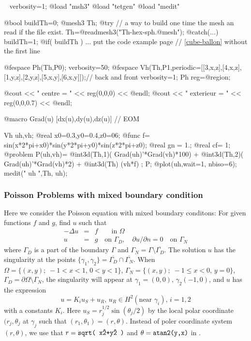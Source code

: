 \documentclass[a4paper,twoside,12pt]{book}
\def\p{\partial}
\begin{document}
\begin{example}~
\label{exm:Period-Poisson-cube-ballon}
\bFF
verbosity=1;
@load "msh3"
@load "tetgen"
@load "medit"

@bool buildTh=0;
@mesh3 Th;
@try { //  a way to build one time the mesh an read if the file exist.
  Th=@readmesh3("Th-hex-sph.@mesh");
 }
@catch(...) { buildTh=1;}
@if( buildTh ){
  ...
 put the code  example  page // \ref{cube-ballon}\pageref{cube-ballon}
  without the first line
 }


@fespace Ph(Th,P0);
verbosity=50;
@fespace Vh(Th,P1,periodic=[[3,x,z],[4,x,z],[1,y,z],[2,y,z],[5,x,y],[6,x,y]]);// back and front
verbosity=1;
Ph reg=@region;

@cout << "  centre = " << reg(0,0,0) << @endl;
@cout << " exterieur = " << reg(0,0,0.7) << @endl;

@macro Grad(u) [dx(u),dy(u),dz(u)] // EOM

Vh uh,vh;
@real x0=0.3,y0=0.4,z0=06;
@func f= sin(x*2*pi+x0)*sin(y*2*pi+y0)*sin(z*2*pi+z0);
@real gn = 1.;
@real cf= 1;
@problem P(uh,vh)=
     @int3d(Th,1)( Grad(uh)'*Grad(vh)*100)
  +  @int3d(Th,2)( Grad(uh)'*Grad(vh)*2)
  + @int3d(Th) (vh*f)
  ;
  P;
@plot(uh,wait=1, nbiso=6);
medit("   uh ",Th, uh);
\eFF


\end{example}
\subsubsection{Poisson Problems with mixed boundary condition}
Here we consider the Poisson equation with mixed boundary
conditons: For given functions $f$ and $g$, find $u$ such that
\begin{eqnarray}
\label{eqn:mixBoundary}
-\Delta u &=& f\qquad \textrm{in }\Omega\nonumber\\
u&=&g\quad \textrm{on }\Gamma_D,\quad
\p u/\p n=0\quad \textrm{on }\Gamma_N
\end{eqnarray}
where $\Gamma_D$ is a part of the boundary $\Gamma$ and
$\Gamma_N=\Gamma\setminus \overline{\Gamma_D}$.
The solution $u$ has the singularity at the points
$\{\gamma_1,\gamma_2\}=\overline{\Gamma_D}\cap\overline{\Gamma_N}$.
When $\Omega=\{(x,y);\; -1<x<1,\, 0<y<1\}$,
$\Gamma_N=\{(x,y);\; -1\le x<0,\, y=0\}$,\,
$\Gamma_D=\p \Omega\setminus \Gamma_N$,
the singularity will appear at $\gamma_1=(0,0),\, \gamma_2(-1,0)$,
and $u$ has the expression
$$
u=K_iu_S + u_R,\, u_R\in H^2(\textrm{near }\gamma_i),\, i=1,2
$$
with a constants $K_i$.
Here $u_S = r_j^{1/2}\sin(\theta_j/2)$ by the local polar coordinate
$(r_j,\theta_j$ at $\gamma_j$ such that
$(r_1,\theta_1)=(r,\theta)$.
Instead of poler coordinate system $(r,\theta)$, we use that
$r=\ttCC{sqrt( x\^2+y\^2 )}$ and $\theta = \ttCC{atan2(y,x)}$
in \freefempp.
\end{document}
